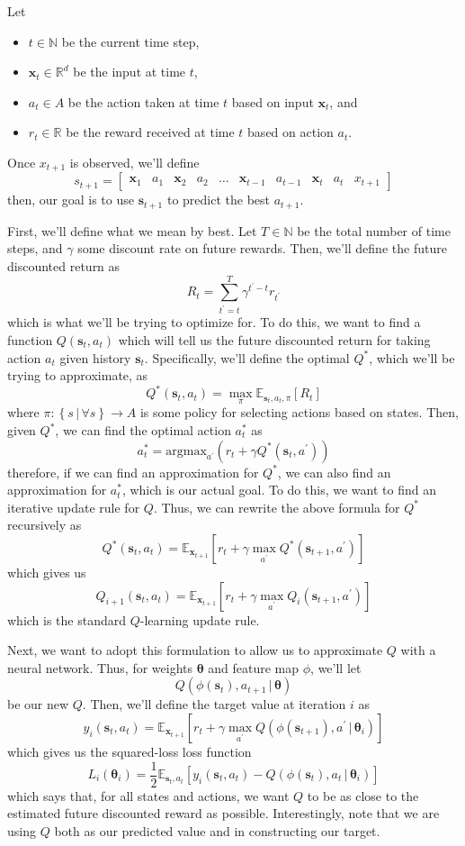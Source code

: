 \documentclass[12pt,letterpaper]{hmcpset}
\newcommand{\m}[1]{\begin{bmatrix}#1\end{bmatrix}}
\newcommand{\tx}[1]{\text{#1}}
\newcommand{\pn}[1]{\left(#1\right)}
\newcommand{\bk}[1]{\left[#1\right]}
\newcommand{\set}[1]{\left\{#1\right\}}
\newcommand{\given}{\,|\,}
\newcommand{\bbm}[1]{\mathbb{#1}}
\begin{document}
Let
\begin{itemize}
\item $t \in \bbm N$ be the current time step,
\item $\bm x_t \in \bbm R^d$ be the input at time $t$,
\item $a_t \in A$ be the action taken at time $t$ based on input $\bm x_t$, and
\item $r_t \in \bbm R$ be the reward received at time $t$ based on action $a_t$.
\end{itemize}
Once $x_{t+1}$ is observed, we'll define
\[
    s_{t+1} = \m{\bm x_1 & a_1 & \bm x_2 & a_2 & \ldots & \bm x_{t-1} & a_{t-1} & \bm x_t & a_t & x_{t+1}}
\]
then, our goal is to use $\bm s_{t+1}$ to predict the best $a_{t+1}$.

First, we'll define what we mean by best. Let $T \in \bbm N$ be the total number of time steps, and $\gamma$ some discount rate on future rewards. Then, we'll define the future discounted return as
\[
    R_t = \sum_{t^\prime = t}^T \gamma^{t^\prime - t} r_{t^\prime}
\]
which is what we'll be trying to optimize for. To do this, we want to find a function $Q(\bm s_t, a_t)$ which will tell us the future discounted return for taking action $a_t$ given history $\bm s_t$. Specifically, we'll define the optimal $Q^*$, which we'll be trying to approximate, as
\[
    Q^*(\bm s_t, a_t) = \max_\pi \bbm E_{\bm s_t, a_t, \pi} \bk{R_t}
\]
where $\pi: \set{s \given \forall s} \to A$ is some policy for selecting actions based on states. Then, given $Q^*$, we can find the optimal action $a_t^*$ as
\[
    a_t^* = \tx{argmax}_{a^\prime}\pn{r_t + \gamma Q^*(\bm s_t, a^\prime)}
\]
therefore, if we can find an approximation for $Q^*$, we can also find an approximation for $a_t^*$, which is our actual goal. To do this, we want to find an iterative update rule for $Q$. Thus, we can rewrite the above formula for $Q^*$ recursively as
\[
    Q^*(\bm s_t, a_t) = \bbm E_{\bm x_{t+1}} \bk{r_t + \gamma \max_{a^\prime} Q^*(\bm s_{t+1}, a^\prime)}
\]
which gives us
\[
    Q_{i+1}(\bm s_t, a_t) = \bbm E_{\bm x_{t+1}} \bk{r_t + \gamma \max_{a^\prime} Q_i(\bm s_{t+1}, a^\prime)}
\]
which is the standard $Q$-learning update rule.

Next, we want to adopt this formulation to allow us to approximate $Q$ with a neural network. Thus, for weights $\bm\theta$ and feature map $\phi$, we'll let
\[
    Q(\phi(\bm s_t), a_{t+1} \given \bm\theta)
\]
be our new $Q$. Then, we'll define the target value at iteration $i$ as
\[
    y_i(\bm s_t, a_t) = \bbm E_{\bm x_{t+1}} \bk{r_t + \gamma \max_{a^\prime} Q(\phi(\bm s_{t+1}), a^\prime \given \bm\theta_i)}
\]
which gives us the squared-loss loss function
\[
    L_i(\bm \theta_i) = \frac{1}{2} \bbm E_{\bm s_t, a_t} \bk{y_i(\bm s_t, a_t) - Q(\phi(\bm s_t), a_t \given \bm \theta_i)}
\]
which says that, for all states and actions, we want $Q$ to be as close to the estimated future discounted reward as possible. Interestingly, note that we are using $Q$ both as our predicted value and in constructing our target.
\end{document}
